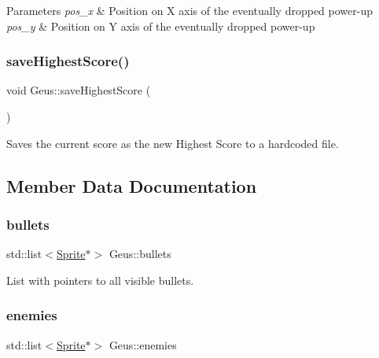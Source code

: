 \begin{DoxyParams}{Parameters}
{\em pos\+\_\+x} & Position on X axis of the eventually dropped power-\/up \\
\hline
{\em pos\+\_\+y} & Position on Y axis of the eventually dropped power-\/up \\
\hline
\end{DoxyParams}
\mbox{\label{classGeus_ac39cd26c767b6508030a3a203de80ade}} 
\subsubsection{\texorpdfstring{save\+Highest\+Score()}{saveHighestScore()}}
{\footnotesize\ttfamily void Geus\+::save\+Highest\+Score (\begin{DoxyParamCaption}{ }\end{DoxyParamCaption})\hspace{0.3cm}{\ttfamily [private]}}



Saves the current score as the new Highest Score to a hardcoded file. 



\subsection{Member Data Documentation}
\mbox{\label{classGeus_a48aec553db9de3be3f1cbf0a8d14a1c8}} 
\subsubsection{\texorpdfstring{bullets}{bullets}}
{\footnotesize\ttfamily std\+::list$<$\hyperlink{classSprite}{Sprite}$\ast$$>$ Geus\+::bullets\hspace{0.3cm}{\ttfamily [private]}}



List with pointers to all visible bullets. 

\mbox{\label{classGeus_a182b15c0dcf2def10eb8f084b4e6ce4f}} 
\subsubsection{\texorpdfstring{enemies}{enemies}}
{\footnotesize\ttfamily std\+::list$<$\hyperlink{classSprite}{Sprite}$\ast$$>$ Geus\+::enemies\hspace{0.3cm}{\ttfamily [private]}}



